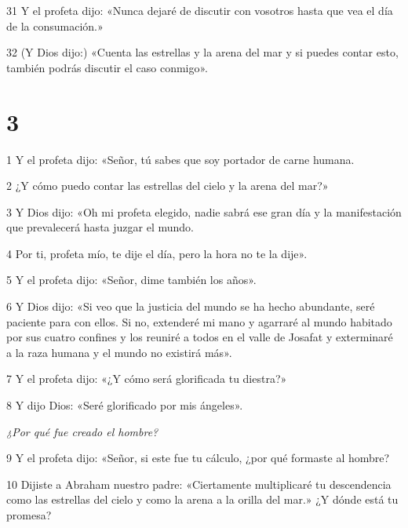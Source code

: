 \par 31 Y el profeta dijo: «Nunca dejaré de discutir con vosotros hasta que vea el día de la consumación.»

\par 32 (Y Dios dijo:) «Cuenta las estrellas y la arena del mar y si puedes contar esto, también podrás discutir el caso conmigo».

\chapter{3}

\par 1 Y el profeta dijo: «Señor, tú sabes que soy portador de carne humana. 

\par 2 ¿Y cómo puedo contar las estrellas del cielo y la arena del mar?»

\par 3 Y Dios dijo: «Oh mi profeta elegido, nadie sabrá ese gran día y la manifestación que prevalecerá hasta juzgar el mundo.

\par 4 Por ti, profeta mío, te dije el día, pero la hora no te la dije».

\par 5 Y el profeta dijo: «Señor, dime también los años». 

\par 6 Y Dios dijo: «Si veo que la justicia del mundo se ha hecho abundante, seré paciente para con ellos. Si no, extenderé mi mano y agarraré al mundo habitado por sus cuatro confines y los reuniré a todos en el valle de Josafat y exterminaré a la raza humana y el mundo no existirá más».

\par 7 Y el profeta dijo: «¿Y cómo será glorificada tu diestra?»

\par 8 Y dijo Dios: «Seré glorificado por mis ángeles».

\par \textit{¿Por qué fue creado el hombre?}

\par 9 Y el profeta dijo: «Señor, si este fue tu cálculo, ¿por qué formaste al hombre?

\par 10 Dijiste a Abraham nuestro padre: «Ciertamente multiplicaré tu descendencia como las estrellas del cielo y como la arena a la orilla del mar.» ¿Y dónde está tu promesa?

